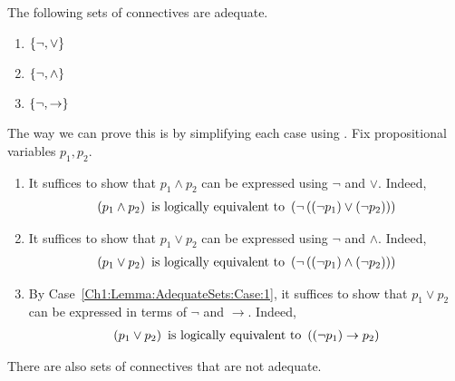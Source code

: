 \begin{boxexample}
    The following sets of connectives are adequate.
    \begin{enumerate}[noitemsep, label = \normalfont(\roman*)]
        \item\label{Ch1:Lemma:AdequateSets:Case:1} $\left\{ \neg, \lor \right\}$
        \item $\left\{ \neg, \land \right\}$
        \item $\left\{ \neg, \to \right\}$
    \end{enumerate}
    The way we can prove this is by simplifying each case using . Fix propositional variables $p_1, p_2$.
    \begin{enumerate}[label = \normalfont(\roman*)]
        \item It suffices to show that $p_1 \land p_2$ can be expressed using $\neg$ and $\lor$. Indeed,
        \begin{align*}
            \left( p_1 \land p_2 \right) \text{ is logically equivalent to } \left( \neg\left( \left( \neg p_1 \right) \lor \left( \neg p_2 \right) \right) \right)
        \end{align*}
        
        \item It suffices to show that $p_1 \lor p_2$ can be expressed using $\neg$ and $\land$. Indeed,
        \begin{align*}
            \left( p_1 \lor p_2 \right) \text{ is logically equivalent to } \left( \neg\left( \left( \neg p_1 \right) \land \left( \neg p_2 \right) \right) \right)
        \end{align*}

        \item By Case~\ref{Ch1:Lemma:AdequateSets:Case:1}, it suffices to show that $p_1 \lor p_2$ can be expressed in terms of $\neg$ and $\to$. Indeed,
        \begin{align*}
            \left( p_1 \lor p_2 \right) \text{ is logically equivalent to } \left( \left( \neg p_1 \right) \to p_2 \right)
        \end{align*}
    \end{enumerate}
\end{boxexample}

There are also sets of connectives that are not adequate.

